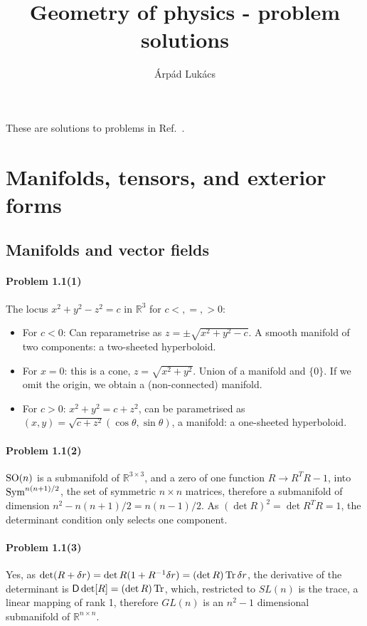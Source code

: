 \documentclass[a4paper,12pt]{article}
\title{Geometry of physics - problem solutions}
\author{Árpád Lukács}
\def\op#1{{\sf #1}}
\def\Tr{\ensuremath{\mathop{\rm Tr}}}
\newcommand{\problem}[1]{\paragraph{Problem #1}}
\begin{document}

\maketitle

These are solutions to problems in Ref.\ \cite{Frankel}.


\section{Manifolds, tensors, and exterior forms}

\subsection{Manifolds and vector fields}


\problem{1.1(1)} The locus $x^2 + y^2 - z^2 = c$ in $\mathbb{R}^3$ for $c <,=,> 0$:
\begin{itemize}
\item For $c<0$: Can reparametrise as $z = \pm \sqrt{x^2 + y^2 - c}$. A smooth manifold of two components: a two-sheeted hyperboloid.
\item For $x=0$: this is a cone, $z=\sqrt{x^2+y^2}$. Union of a manifold and $\{0\}$. If we omit the origin, we obtain a (non-connected) manifold. 
\item For $c>0$: $x^2 + y^2 = c + z^2$, can be parametrised as $(x,y) = \sqrt{c+z^2}(\cos\theta, \sin{\theta})$, a manifold: a one-sheeted hyperboloid.
\end{itemize}


\problem{1.1(2)} ${\rm SO}(n)$ is a submanifold of $\mathbb{R}^{3\times 3}$, and a zero of one function $R\to R^T R -1$, into ${\rm Sym}^{n(n+1)/2}$, the set of symmetric $n\times n$ matrices, therefore a submanifold of dimension $n^2 - n(n+1)/2 = n(n-1)/2$.
As $(\det R)^2 = \det R^T R = 1$, the determinant condition only selects one component.


\problem{1.1(3)} Yes, as $\det (R+\delta r) = \det R (1 + R^{-1}\delta r) = (\det R)\Tr \delta r$, the derivative of the determinant is $\op{D}\det [R] = (\det R)\Tr$, which, restricted to $SL(n)$ is the trace, a linear mapping of rank 1, therefore $GL(n)$ is an $n^2-1$ dimensional submanifold of $\mathbb{R}^{n\times n}$.
\end{document}
